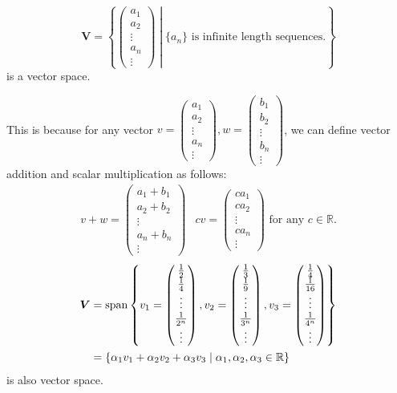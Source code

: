 \begin{example}
\[
\bm V = \left\{\begin{pmatrix}
a_1\\a_2\\\vdots\\a_n\\\vdots
\end{pmatrix}
\middle|
 \{a_n\}\text{ is infinite length sequences.} \right\}
\] 
is a vector space.

This is because for any vector $v = \begin{pmatrix}
a_1\\a_2\\\vdots\\a_n\\\vdots
\end{pmatrix},w = \begin{pmatrix}
b_1\\b_2\\\vdots\\b_n\\\vdots
\end{pmatrix}$, we can define vector addition and scalar multiplication as follows:
\[
\begin{array}{ll}
v+w = \begin{pmatrix}
a_1+b_1\\a_2+b_2\\\vdots\\a_n+b_n\\\vdots
\end{pmatrix}
&
cv = \begin{pmatrix}
ca_1\\ca_2\\\vdots\\ca_n\\\vdots
\end{pmatrix}
\mbox{ for any $c\in\mathbb{R}$}.
\end{array}
\]
\[
\begin{aligned}
\bm V &= \operatorname{span}\left\{v_1=\begin{pmatrix}
\frac{1}{2}\\\frac{1}{4}\\\vdots\\\frac{1}{2^n}\\\vdots
\end{pmatrix},v_2=\begin{pmatrix}
\frac{1}{3}\\\frac{1}{9}\\\vdots\\\frac{1}{3^n}\\\vdots
\end{pmatrix},v_3=\begin{pmatrix}
\frac{1}{4}\\\frac{1}{16}\\\vdots\\\frac{1}{4^n}\\\vdots
\end{pmatrix}\right\} \\
&= \{\alpha_1v_1+\alpha_2v_2+\alpha_3v_3\mid \alpha_1,\alpha_2,\alpha_3\in\mathbb{R}\}
\end{aligned}
\] 
is also vector space. 


\end{example}
